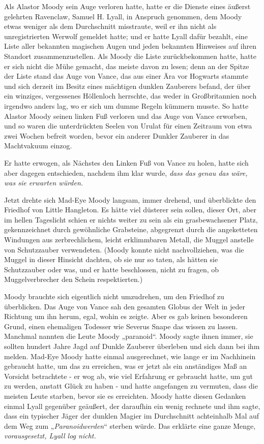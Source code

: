 {Als Alastor Moody sein Auge verloren hatte, hatte er die Dienste eines äußerst gelehrten Ravenclaw, Samuel H. Lyall, in Anspruch genommen, dem Moody etwas weniger als dem Durchschnitt misstraute, weil er ihn nicht als unregistrierten Werwolf gemeldet hatte; und er hatte Lyall dafür bezahlt, eine Liste aller bekannten magischen Augen und jeden bekannten Hinweises auf ihren Standort zusammenzustellen. Als Moody die Liste zurückbekommen hatte, hatte er sich nicht die Mühe gemacht, das meiste davon zu lesen; denn an der Spitze der Liste stand das Auge von Vance, das aus einer Ära vor Hogwarts stammte und sich derzeit im Besitz eines mächtigen dunklen Zauberers befand, der über ein winziges, vergessenes Höllenloch herrschte, das weder in Großbritannien noch irgendwo anders lag, wo er sich um dumme Regeln kümmern musste. So hatte Alastor Moody seinen linken Fuß verloren und das Auge von Vance erworben, und so waren die unterdrückten Seelen von Urulat für einen Zeitraum von etwa zwei Wochen befreit worden, bevor ein anderer Dunkler Zauberer in das Machtvakuum einzog.

Er hatte erwogen, als Nächstes den Linken Fuß von Vance zu holen, hatte sich aber dagegen entschieden, nachdem ihm klar wurde, \emph{dass das genau das wäre, was sie erwarten würden.}

Jetzt drehte sich Mad-Eye Moody langsam, immer drehend, und überblickte den Friedhof von Little Hangleton. Es hätte viel düsterer sein sollen, dieser Ort, aber im hellen Tageslicht schien er nichts weiter zu sein als ein grasbewachsener Platz, gekennzeichnet durch gewöhnliche Grabsteine, abgegrenzt durch die angeketteten Windungen aus zerbrechlichem, leicht erklimmbaren Metall, die Muggel anstelle von Schutzzauber verwendeten. (Moody konnte nicht nachvollziehen, was die Muggel in dieser Hinsicht dachten, ob sie nur so taten, als hätten sie Schutzzauber oder was, und er hatte beschlossen, nicht zu fragen, ob Muggelverbrecher den Schein respektierten.)

Moody brauchte sich eigentlich nicht umzudrehen, um den Friedhof zu überblicken. Das Auge von Vance sah den gesamten Globus der Welt in jeder Richtung um ihn herum, egal, wohin es zeigte. Aber es gab keinen besonderen Grund, einen ehemaligen Todesser wie Severus Snape das wissen zu lassen. Manchmal nannten die Leute Moody „paranoid“. Moody sagte ihnen immer, sie sollten hundert Jahre Jagd auf Dunkle Zauberer überleben und sich dann bei ihm melden. Mad-Eye Moody hatte einmal ausgerechnet, wie lange er im Nachhinein gebraucht hatte, um das zu erreichen, was er jetzt als ein anständiges Maß an Vorsicht betrachtete - er wog ab, wie viel Erfahrung er gebraucht hatte, um gut zu werden, anstatt Glück zu haben - und hatte angefangen zu vermuten, dass die meisten Leute starben, bevor sie es erreichten. Moody hatte diesen Gedanken einmal Lyall gegenüber geäußert, der daraufhin ein wenig rechnete und ihm sagte, dass ein typischer Jäger der dunklen Magier im Durchschnitt achteinhalb Mal auf dem Weg zum „\emph{Paranoidwerden}“ sterben würde. Das erklärte eine ganze Menge, \emph{vorausgesetzt, Lyall log nicht.}

}
